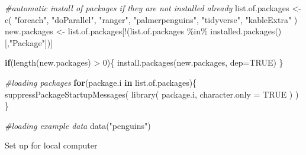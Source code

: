 \documentclass[
]{book}
\newenvironment{Shaded}{\begin{snugshade}}{\end{snugshade}}
\newcommand{\AttributeTok}[1]{\textcolor[rgb]{0.77,0.63,0.00}{#1}}
\newcommand{\CommentTok}[1]{\textcolor[rgb]{0.56,0.35,0.01}{\textit{#1}}}
\newcommand{\ConstantTok}[1]{\textcolor[rgb]{0.00,0.00,0.00}{#1}}
\newcommand{\ControlFlowTok}[1]{\textcolor[rgb]{0.13,0.29,0.53}{\textbf{#1}}}
\newcommand{\DecValTok}[1]{\textcolor[rgb]{0.00,0.00,0.81}{#1}}
\newcommand{\FunctionTok}[1]{\textcolor[rgb]{0.00,0.00,0.00}{#1}}
\newcommand{\NormalTok}[1]{#1}
\newcommand{\OtherTok}[1]{\textcolor[rgb]{0.56,0.35,0.01}{#1}}
\newcommand{\SpecialCharTok}[1]{\textcolor[rgb]{0.00,0.00,0.00}{#1}}
\newcommand{\StringTok}[1]{\textcolor[rgb]{0.31,0.60,0.02}{#1}}
\begin{document}
\begin{Shaded}
\begin{Highlighting}[]
\CommentTok{\#automatic install of packages if they are not installed already}
\NormalTok{list.of.packages }\OtherTok{\textless{}{-}} \FunctionTok{c}\NormalTok{(}
  \StringTok{"foreach"}\NormalTok{,}
  \StringTok{"doParallel"}\NormalTok{,}
  \StringTok{"ranger"}\NormalTok{,}
  \StringTok{"palmerpenguins"}\NormalTok{,}
  \StringTok{"tidyverse"}\NormalTok{,}
  \StringTok{"kableExtra"}
\NormalTok{  )}
\NormalTok{new.packages }\OtherTok{\textless{}{-}}\NormalTok{ list.of.packages[}\SpecialCharTok{!}\NormalTok{(list.of.packages }\SpecialCharTok{\%in\%} \FunctionTok{installed.packages}\NormalTok{()[,}\StringTok{"Package"}\NormalTok{])]}

\ControlFlowTok{if}\NormalTok{(}\FunctionTok{length}\NormalTok{(new.packages) }\SpecialCharTok{\textgreater{}} \DecValTok{0}\NormalTok{)\{}
  \FunctionTok{install.packages}\NormalTok{(new.packages, }\AttributeTok{dep=}\ConstantTok{TRUE}\NormalTok{)}
\NormalTok{\}}

\CommentTok{\#loading packages}
\ControlFlowTok{for}\NormalTok{(package.i }\ControlFlowTok{in}\NormalTok{ list.of.packages)\{}
  \FunctionTok{suppressPackageStartupMessages}\NormalTok{(}
    \FunctionTok{library}\NormalTok{(}
\NormalTok{      package.i, }
      \AttributeTok{character.only =} \ConstantTok{TRUE}
\NormalTok{      )}
\NormalTok{    )}
\NormalTok{\}}

\CommentTok{\#loading example data}
\FunctionTok{data}\NormalTok{(}\StringTok{"penguins"}\NormalTok{)}
\end{Highlighting}
\end{Shaded}

Set up for local computer
\end{document}
